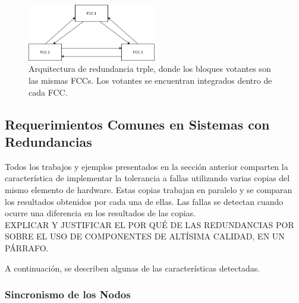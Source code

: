 \begin{figure}[H]
    \centering
    \includegraphics[width=0.5\textwidth]{img/3_5_TMR_2.png}
    \caption{Arquitectura de redundancia trple, donde los bloques votantes son las mismas FCCs. Los votantes se encuentran integrados dentro de cada FCC.}
    \label{fig:3_5_TMR_2}
\end{figure}

\subsection{Requerimientos Comunes en Sistemas con Redundancias}

Todos los trabajos y ejemplos presentados en la sección anterior comparten la característica de implementar la tolerancia a fallas utilizando varias copias del mismo elemento de hardware. Estas copias trabajan en paralelo y se comparan los resultados obtenidos por cada una de ellas. Las fallas se detectan cuando ocurre una diferencia en los resultados de las copias.\\

{\color{red} EXPLICAR Y JUSTIFICAR EL POR QUÉ DE LAS REDUNDANCIAS POR SOBRE EL USO DE COMPONENTES DE ALTÍSIMA CALIDAD, EN UN PÁRRAFO.}

A continuación, se describen algunas de las características detectadas.

\subsubsection{Sincronismo de los Nodos}

